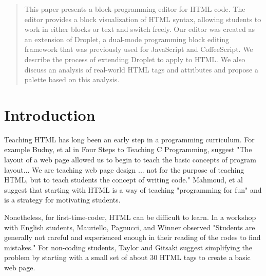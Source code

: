 \documentclass[conference]{IEEEtran}
\begin{document}
\begin{abstract}
This paper presents a block-programming editor for HTML code.  The editor provides a block visualization of HTML syntax, allowing students to work in either blocks or text and switch freely.  Our editor was created as an extension of Droplet, a dual-mode programming block editing framework that was previously used for JavaScript and CoffeeScript. We describe the process of extending Droplet to apply to HTML. We also discuss an analysis of real-world HTML tags and attributes and propose a palette based on this analysis.

\end{abstract}





%
\IEEEpeerreviewmaketitle

\section{Introduction}
Teaching HTML has long been an early step in a programming curriculum.  For example Budny, et al \cite{Budny} in Four Steps to Teaching C Programming, suggest "The layout of a web page allowed us to begin to teach the basic concepts of program layout... We are teaching web page design ... not for the purpose of teaching HTML, but to teach students the concept of writing code." Mahmoud, et al \cite{Mahmoud} suggest that starting with HTML is a way of teaching "programming for fun" and is a strategy for motivating students.

Nonetheless, for first-time-coder, HTML can be difficult to learn.  In a workshop with English students, Mauriello, Pagnucci, and Winner \cite{Mauriello} observed "Students are generally not careful and experienced enough in their reading of the codes to find mistakes."  For non-coding students, Taylor and Gitsaki \cite{Taylor} suggest simplifying the problem by starting with a small set of about 30 HTML tags to create a basic web page.
\end{document}
